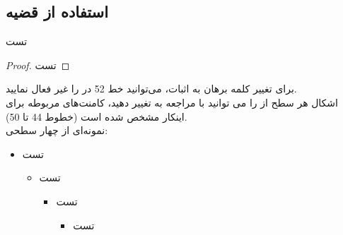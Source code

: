 \subsection{استفاده از قضیه}
\begin{theorem}
تست
\end{theorem}
\begin{proof}
    تست
\end{proof}
برای تغییر کلمه برهان به اثبات، می‌توانید خط 52 در   را غیر فعال نمایید.
\\
  اشکال هر سطح از   را می توانید با مراجعه به
  تغییر دهید، کامنت‌های مربوطه برای اینکار مشخص شده است (خطوط 44 تا 50).\\
نمونه‌ای از  چهار سطحی:
\begin{itemize}
    \item تست
    \begin{itemize}
        \item تست
        \begin{itemize}
            \item تست
            \begin{itemize}
                \item تست
            \end{itemize}
        \end{itemize}
    \end{itemize}
\end{itemize}
